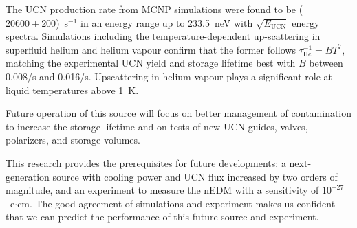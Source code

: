 The UCN production rate from MCNP simulations were found to be
($20600\pm 200$)~s$^{-1}$ in an energy range up to 233.5~neV with
$\sqrt{E_\mathrm{UCN}}$ energy spectra. Simulations including the
temperature-dependent up-scattering in superfluid helium and helium
vapour confirm that the former follows
$\tau_{\mathrm He} ^{-1} = B T^7$, matching the experimental UCN yield
and storage lifetime best with $B$ between 0.008/s and
0.016/s. Upscattering in helium vapour plays a significant role at
liquid temperatures above 1~K.

Future operation of this source will focus on better management of
contamination to increase the storage lifetime and on tests of new UCN
guides, valves, polarizers, and storage volumes.

This research provides the prerequisites for future developments: a
next-generation source with cooling power and UCN flux increased by
two orders of magnitude, and an experiment to measure the nEDM with a
sensitivity of $10^{-27}$~e$\cdot$cm. The good agreement of
simulations and experiment makes us confident that we can predict the
performance of this future source and experiment.









  
  
  
